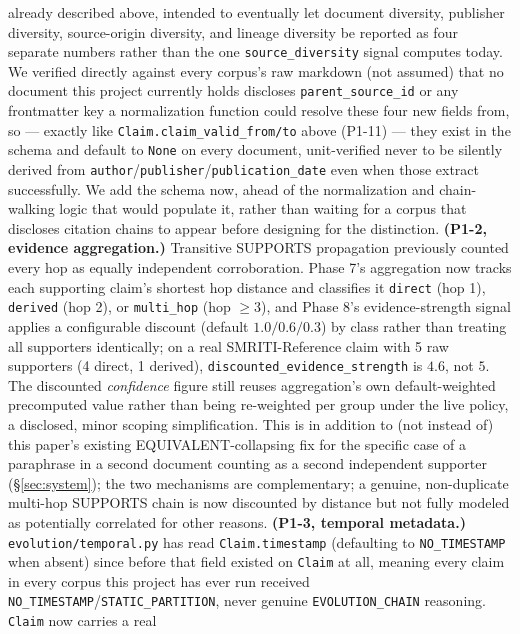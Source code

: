 already described above, intended to eventually let document diversity,
publisher diversity, source-origin diversity, and lineage diversity be
reported as four separate numbers rather than the one
\texttt{source\_diversity} signal computes today. We verified directly
against every corpus's raw markdown (not assumed) that no document this
project currently holds discloses \texttt{parent\_source\_id} or any
frontmatter key a normalization function could resolve these four new
fields from, so --- exactly like \texttt{Claim.claim\_valid\_from/to}
above (P1-11) --- they exist in the schema and default to \texttt{None}
on every document, unit-verified never to be silently derived from
\texttt{author}/\texttt{publisher}/\texttt{publication\_date} even when
those extract successfully. We add the schema now, ahead of the
normalization and chain-walking logic that would populate it, rather
than waiting for a corpus that discloses citation chains to appear before
designing for the distinction. \textbf{(P1-2, evidence
aggregation.)} Transitive SUPPORTS propagation previously counted every
hop as equally independent corroboration. Phase 7's aggregation now
tracks each supporting claim's shortest hop distance and classifies it
\texttt{direct} (hop 1), \texttt{derived} (hop 2), or \texttt{multi\_hop}
(hop $\geq 3$), and Phase 8's evidence-strength signal applies a
configurable discount (default $1.0/0.6/0.3$) by class rather than
treating all supporters identically; on a real SMRITI-Reference claim
with 5 raw supporters (4 direct, 1 derived), \texttt{discounted\_evidence\_strength}
is $4.6$, not $5$. The discounted \emph{confidence} figure still reuses
aggregation's own default-weighted precomputed value rather than being
re-weighted per group under the live policy, a disclosed, minor scoping
simplification. This is in addition to (not instead of) this paper's
existing EQUIVALENT-collapsing fix for the specific case of a paraphrase
in a second document counting as a second independent supporter
(\S\ref{sec:system}); the two mechanisms are complementary; a genuine,
non-duplicate multi-hop SUPPORTS chain is now discounted by distance but
not fully modeled as potentially correlated for other reasons.
\textbf{(P1-3, temporal metadata.)} \texttt{evolution/temporal.py} has
read \texttt{Claim.timestamp} (defaulting to \texttt{NO\_TIMESTAMP} when
absent) since before that field existed on \texttt{Claim} at all, meaning
every claim in every corpus this project has ever run received
\texttt{NO\_TIMESTAMP}/\texttt{STATIC\_PARTITION}, never genuine
\texttt{EVOLUTION\_CHAIN} reasoning. \texttt{Claim} now carries a real
